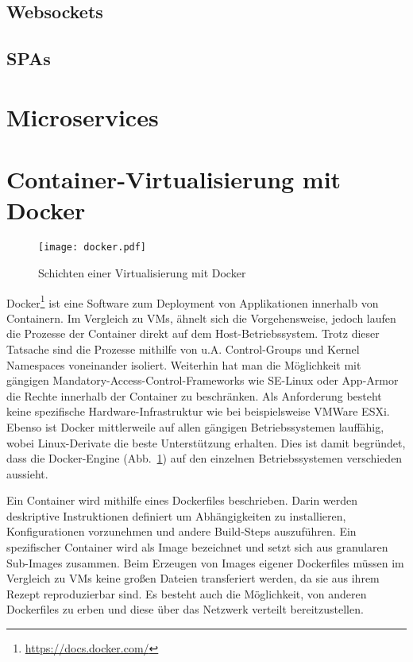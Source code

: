 \subsection{Websockets}
\blindtext
\subsection{\aclp{SPA}}
\blindtext
\section{Microservices}
\blindtext
\section{Container-Virtualisierung mit Docker}
\begin{figure}
  \centering
  \texttt{[image: docker.pdf]}
  \par
  \caption{Schichten einer Virtualisierung mit Docker}
  \label{fig:layers-docker}
\end{figure}
Docker\footnote{\url{https://docs.docker.com/}} ist eine Software zum Deployment von Applikationen innerhalb von Containern.
Im Vergleich zu \acp{VM}, ähnelt sich die Vorgehensweise, jedoch laufen die Prozesse der Container direkt auf dem Host-Betriebssystem.
Trotz dieser Tatsache sind die Prozesse mithilfe von \ac{u.A.} Control-Groups und Kernel Namespaces voneinander isoliert.
Weiterhin hat man die Möglichkeit mit gängigen Mandatory-Access-Control-Frameworks wie SE-Linux oder App-Armor die Rechte innerhalb der Container zu beschränken.
Als Anforderung besteht keine spezifische Hardware-Infrastruktur wie bei beispielsweise VMWare ESXi.
Ebenso ist Docker mittlerweile auf allen gängigen Betriebssystemen lauffähig, wobei Linux-Derivate die beste Unterstützung erhalten.
Dies ist damit begründet, dass die Docker-Engine (\ac{Abb.}~\ref{fig:layers-docker}) auf den einzelnen Betriebssystemen verschieden aussieht.
\par
Ein Container wird mithilfe eines Dockerfiles beschrieben.
Darin werden deskriptive Instruktionen definiert um Abhängigkeiten zu installieren, Konfigurationen vorzunehmen und andere Build-Steps auszuführen.
Ein spezifischer Container wird als Image bezeichnet und setzt sich aus granularen Sub-Images zusammen.
Beim Erzeugen von Images eigener Dockerfiles müssen im Vergleich zu \acp{VM} keine großen Dateien transferiert werden, da sie aus ihrem Rezept reproduzierbar sind. 
Es besteht auch die Möglichkeit, von anderen Dockerfiles zu erben und diese über das Netzwerk verteilt bereitzustellen.
